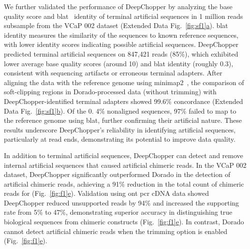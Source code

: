\documentclass[pdflatex,sn-nature, lineno]{sn-jnl}%
\newcommand{\figref}[2]{Fig.~\hyperref[#1]{\ref*{#1}#2}}
\newcommand{\edfigref}[2]{Extended Data Fig.~\hyperref[#1]{\ref*{#1}#2}}
\theoremstyle{thmstyleone}%
\theoremstyle{thmstyletwo}%
\theoremstyle{thmstylethree}%
\begin{document}
We further validated the performance of DeepChopper by analyzing the base quality score and \gls{blat}~\cite{kent2002blat} identity of terminal artificial sequences in 1 million reads subsample from the VCaP 002 dataset (\edfigref{fig:sf1}{a}).
\gls{blat} identity measures the similarity of the sequences to known reference sequences, with lower identity scores indicating possible artificial sequences.
DeepChopper predicted terminal artificial sequences on 847,421 reads (85\%), which exhibited lower average base quality scores (around 10) and \gls{blat} identity (roughly 0.3), consistent with sequencing artifacts or erroneous terminal adapters.
After aligning the data with the reference genome using minimap2~\cite{li2018minimap2}, the comparison of soft-clipping regions in Dorado-processed data (without trimming) with DeepChopper-identified terminal adapters showed 99.6\% concordance (\edfigref{fig:sf1}{b}).
Of the 0. 4\% nonaligned sequences, 97\% failed to map to the reference genome using \gls{blat}, further confirming their artificial nature.
These results underscore DeepChopper's reliability in identifying artificial sequences, particularly at read ends, demonstrating its potential to improve data quality.

In addition to terminal artificial sequences, DeepChopper can detect and remove internal artificial sequences that caused artificial chimeric reads.
In the VCaP 002 dataset, DeepChopper significantly outperformed Dorado in the detection of artificial chimeric reads, achieving a 91\% reduction in the total count of chimeric reads for (\figref{fig:f1}{e}).
Validation using \gls{ont} \gls{pcr} cDNA data showed DeepChopper reduced unsupported reads by 94\% and increased the supporting rate from 5\% to 47\%, demonstrating superior accuracy in distinguishing true biological sequences from chimeric constructs (\figref{fig:f1}{e}).
In contrast, Dorado cannot detect artificial chimeric reads when the trimming option is enabled (\figref{fig:f1}{e}).
\end{document}

